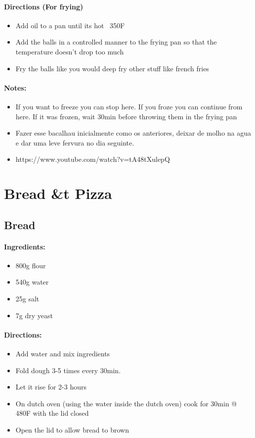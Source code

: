 \documentclass{article}
\begin{document}
\paragraph{Directions (For frying)}
\begin{itemize}
	\item Add oil to a pan until its hot ~350F
	\item Add the balls in a controlled manner to the frying pan so that the temperature doesn't drop too much
	\item Fry the balls like you would deep fry other stuff like french fries
\end{itemize}

\paragraph{Notes:}
\begin{itemize}
	\item If you want to freeze you can stop here. If you froze you can continue from here. If it was frozen, wait 30min before throwing them in the frying pan
	\item Fazer esse bacalhau inicialmente como os anteriores, deixar de molho na agua e dar uma leve fervura no dia seguinte.
	\item https://www.youtube.com/watch?v=tA48tXulepQ
\end{itemize}

\section{Bread \&t Pizza}

\subsection{Bread}{}

\paragraph{Ingredients:}

\begin{itemize}
	\item 800g flour
	\item 540g water
	\item 25g salt
	\item 7g dry yeast
\end{itemize}

\paragraph{Directions:}
\begin{itemize}
	\item Add water and mix ingredients
	\item Fold dough 3-5 times every 30min.
	\item Let it rise for 2-3 hours
	\item On dutch oven (using the water inside the dutch oven) cook for 30min @ 480F with the lid closed
	\item Open the lid to allow bread to brown
\end{itemize}
\end{document}
